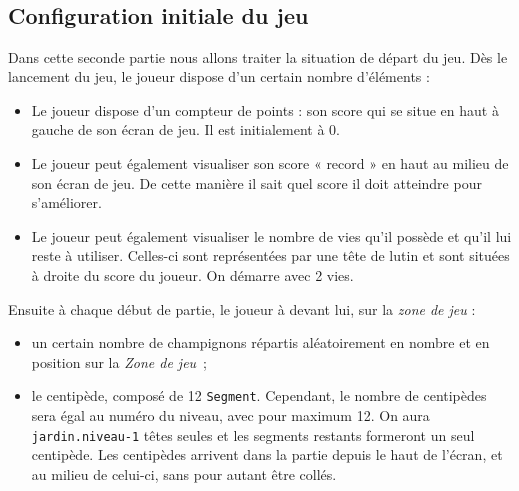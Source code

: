 \begin{typeag}[Ennemi]
        \\
        \\
		\\
        \\
\end{typeag}


\subsection{Configuration initiale du jeu}
Dans cette seconde partie nous allons traiter la situation de départ du jeu. Dès le lancement du jeu, le joueur dispose d'un certain nombre d'éléments : 

\begin{itemize}
	\item Le joueur dispose d'un compteur de points : son score qui se situe en haut à gauche de son écran de jeu. Il est initialement à 0.
	\item Le joueur peut également visualiser son score « record » en haut au milieu de son écran de jeu. De cette manière il sait quel score il doit atteindre pour s'améliorer.
	\item Le joueur peut également visualiser le nombre de vies qu'il possède et qu'il lui reste à utiliser. Celles-ci sont représentées par une tête de lutin et sont situées à droite du score du joueur. On démarre avec 2 vies.
\end{itemize}

Ensuite à chaque début de partie, le joueur à devant lui, sur la \emph{zone de jeu} : 

\begin{itemize}
	\item un certain nombre de champignons répartis aléatoirement en nombre et en position sur la  \emph{Zone de jeu}~;
	\item le centipède, composé de 12 \texttt{Segment}. Cependant, le nombre de centipèdes sera égal au numéro du niveau, avec pour maximum 12. On aura \texttt{jardin.niveau-1} têtes seules et les segments restants formeront un seul centipède. Les centipèdes arrivent dans la partie depuis le haut de l'écran, et au milieu de celui-ci, sans pour autant être collés.
\end{itemize}
 
